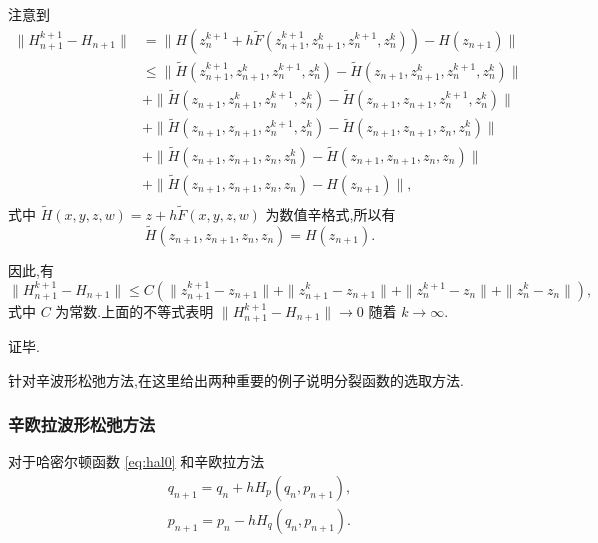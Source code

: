 注意到
\begin{equation*}
\begin{aligned}
\|H^{k+1}_{n+1}-H_{n+1}\|&=\|H(z_{n}^{k+1}+h \tilde{F}(z_{n+1}^{k+1},z_{n+1}^{k},z_{n}^{k+1},z_{n}^{k}))-H(z_{n+1})\|\\
&\le \|\tilde{H}(z_{n+1}^{k+1},z_{n+1}^{k},z_{n}^{k+1},z_{n}^{k})-\tilde{H}(z_{n+1},z_{n+1}^{k},z_{n}^{k+1},z_{n}^{k})\|\\
&+\|\tilde{H}(z_{n+1},z_{n+1}^{k},z_{n}^{k+1},z_{n}^{k})-\tilde{H}(z_{n+1},z_{n+1},z_{n}^{k+1},z_{n}^{k})\|\\
&+\|\tilde{H}(z_{n+1},z_{n+1},z_{n}^{k+1},z_{n}^{k})-\tilde{H}(z_{n+1},z_{n+1},z_{n},z_{n}^{k})\|\\
&+\|\tilde{H}(z_{n+1},z_{n+1},z_{n},z_{n}^{k})-\tilde{H}(z_{n+1},z_{n+1},z_{n},z_{n})\|\\
&+\|\tilde{H}(z_{n+1},z_{n+1},z_{n},z_{n})-H(z_{n+1})\|,\\
\end{aligned}
\end{equation*}
式中 $\tilde{H}(x,y,z,w)=z+h \tilde{F}(x,y,z,w)$ 为数值辛格式,所以有
\begin{equation*}
\tilde{H}(z_{n+1},z_{n+1},z_{n},z_{n})=H(z_{n+1}).
\end{equation*}

因此,有
\begin{equation*}
\|H^{k+1}_{n+1}-H_{n+1}\|\le C(\|z_{n+1}^{k+1}-z_{n+1}\|+ \|z_{n+1}^{k}-z_{n+1}\|+ \|z_{n}^{k+1}-z_{n}\|+ \|z_{n}^{k}-z_{n}\|),
\end{equation*}
式中 $C$ 为常数.上面的不等式表明 $\|H^{k+1}_{n+1}-H_{n+1}\| \to 0$ 随着 $k \to \infty$.

证毕.

针对辛波形松弛方法,在这里给出两种重要的例子说明分裂函数的选取方法.

\subsubsection{辛欧拉波形松弛方法}
对于哈密尔顿函数 \eqref{eq:hal0} 和辛欧拉方法 \cite{hairer2014challenges}
\begin{equation}\label{eq:symeuler1}
  \begin{array}{c}
    q_{n+1}=q_{n}+hH_{p}(q_{n},p_{n+1}),\\
    p_{n+1}=p_{n}-hH_{q}(q_{n},p_{n+1}).
  \end{array}
\end{equation}

